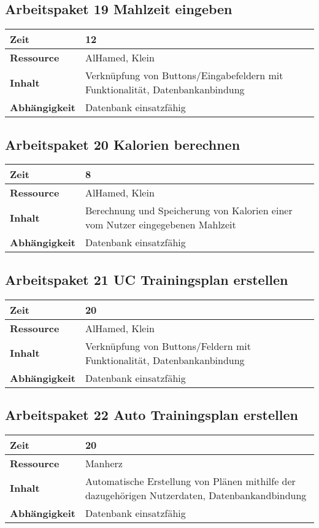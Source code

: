 \documentclass[12pt,a4paper,onecolumn]{article}
\begin{document}
\subsection{Arbeitspaket 19 Mahlzeit eingeben}
\begin{tabularx}{\textwidth}{|l|X|}
\hline
     \textbf{Zeit} & 12 \\
     \hline
     \textbf{Ressource} & AlHamed, Klein\\
     \hline
     \textbf{Inhalt} &  Verknüpfung von Buttons/Eingabefeldern mit Funktionalität, Datenbankanbindung\\
     \hline
     \textbf{Abhängigkeit} & Datenbank einsatzfähig\\
\hline
\end{tabularx}

\subsection{Arbeitspaket 20 Kalorien berechnen}
\begin{tabularx}{\textwidth}{|l|X|}
\hline
     \textbf{Zeit} & 8 \\
     \hline
     \textbf{Ressource} & AlHamed, Klein \\
     \hline
     \textbf{Inhalt} &  Berechnung und Speicherung von Kalorien einer vom Nutzer eingegebenen Mahlzeit\\
     \hline
     \textbf{Abhängigkeit} & Datenbank einsatzfähig\\
\hline
\end{tabularx}

\subsection{Arbeitspaket 21 UC Trainingsplan erstellen}
\begin{tabularx}{\textwidth}{|l|X|}
\hline
     \textbf{Zeit} & 20 \\
     \hline
     \textbf{Ressource} & AlHamed, Klein \\
     \hline
     \textbf{Inhalt} &  Verknüpfung von Buttons/Feldern mit Funktionalität, Datenbankanbindung\\
     \hline
     \textbf{Abhängigkeit} & Datenbank einsatzfähig\\
\hline
\end{tabularx}

\subsection{Arbeitspaket 22 Auto Trainingsplan erstellen}
\begin{tabularx}{\textwidth}{|l|X|}
\hline
     \textbf{Zeit} & 20 \\
     \hline
     \textbf{Ressource} & Manherz\\
     \hline
     \textbf{Inhalt} &  Automatische Erstellung von Plänen mithilfe der dazugehörigen Nutzerdaten, Datenbankandbindung\\
     \hline
     \textbf{Abhängigkeit} & Datenbank einsatzfähig\\
\hline
\end{tabularx}
\end{document}
